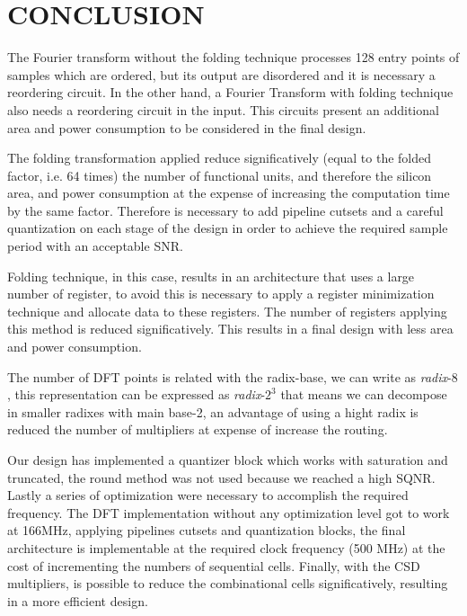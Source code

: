 \documentclass[journal,comsoc]{IEEEtran}
\begin{document}
\FloatBarrier
 
\section{CONCLUSION}
The Fourier transform without the folding technique processes 128 entry points of samples which are ordered, but its output are disordered and it is necessary a reordering circuit. In the other hand, a Fourier Transform with folding technique also needs a reordering circuit in the input. This circuits present an additional area and power consumption to be considered in the final design. 

The folding transformation applied reduce significatively (equal to the folded factor, i.e. 64 times) the number of functional units, and therefore the silicon area, and power consumption at the expense of increasing the computation time by the same factor. Therefore is necessary to add pipeline cutsets and a careful quantization on each stage of the design in order to achieve the required sample period with an acceptable SNR.

Folding technique, in this case, results in an architecture that uses a large number of register, to avoid this is necessary to apply a register minimization technique and allocate data to these registers. The number of registers applying this method is reduced significatively. This results in a final design with less area and power consumption.

The number of DFT points is related with the radix-base, we can write as \textit{radix}-$8$, this representation can be expressed as \textit{radix}-$2^3$ that means we can decompose in smaller radixes with main base-2, an advantage of using a hight radix is reduced the number of multipliers at expense of increase the routing.

Our design has implemented a quantizer block which works with saturation and truncated, the round method was not used because we reached a high SQNR. Lastly a series of optimization were necessary to accomplish the required frequency. The DFT implementation without any optimization level got to work at 166MHz, applying pipelines cutsets and quantization blocks, the final architecture is implementable at the required clock frequency (500 MHz) at the cost of incrementing the numbers of sequential cells. Finally, with the CSD multipliers, is possible to reduce the combinational cells significatively, resulting in a more efficient design. 




\end{document}
